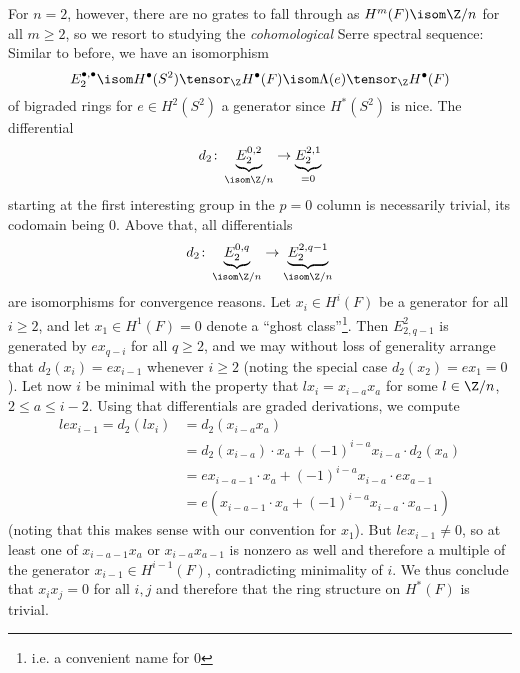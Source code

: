 \begin{solution}
	For $n = 2$, however, there are no grates to fall through as $H^m(F) \isom \Zn{n}$ for all $m \geq 2$, so we resort to studying the \emph{cohomological} Serre spectral sequence:
	Similar to before, we have an isomorphism
	\begin{equation*}
		E_2^{\bullet, \bullet} \isom H^\bullet(S^2) \tensor_{\Z} H^\bullet(F) \isom \Lambda(e) \tensor_{\Z} H^\bullet(F)
	\end{equation*}
	of bigraded rings for $e \in H^2(S^2)$ a generator since $H^*(S^2)$ is nice.
	The differential
	\begin{equation*}
		d_2\colon \underbrace{E_2^{0, 2}}_{\isom \Zn{n}} \to \underbrace{E_2^{2, 1}}_{= 0}
	\end{equation*}
	starting at the first interesting group in the $p = 0$ column is necessarily trivial, its codomain being 0.
	Above that, all differentials
	\begin{equation*}
		d_2\colon \underbrace{E_2^{0, q}}_{\isom \Zn{n}} \to \underbrace{E_2^{2, q - 1}}_{\isom \Zn{n}}
	\end{equation*}
	are isomorphisms for convergence reasons.
	Let $x_i \in H^i(F)$ be a generator for all $i \geq 2$, and let $x_1 \in H^1(F) = 0$ denote a \enquote{ghost class}\footnote{i.e. a convenient name for 0}.
	Then $E^2_{2, q - 1}$ is generated by $e x_{q - i}$ for all $q \geq 2$, and we may without loss of generality arrange that $d_2(x_i) = e x_{i - 1}$ whenever $i \geq 2$ (noting the special case $d_2(x_2) = e x_1 = 0$).
	Let now $i$ be minimal with the property that $l x_i = x_{i - a} x_a$ for some $l \in \Zn{n}$, $2 \leq a \leq i - 2$.
	Using that differentials are graded derivations, we compute
	\begin{align*}
		l e x_{i - 1} = d_2(l x_i) &= d_2(x_{i - a} x_a) \\
								   &= d_2(x_{i - a}) \cdot x_a + (-1)^{i - a} x_{i - a} \cdot d_2(x_a) \\
								   &= e x_{i - a - 1} \cdot x_a + (-1)^{i - a} x_{i - a} \cdot e x_{a - 1} \\
								   &= e (x_{i - a - 1} \cdot x_a + (-1)^{i - a} x_{i - a} \cdot x_{a - 1})
	\end{align*}
	(noting that this makes sense with our convention for $x_1$).
	But $l e x_{i - 1} \neq 0$, so at least one of $x_{i - a - 1} x_a$ or $x_{i - a} x_{a - 1}$ is nonzero as well and therefore a multiple of the generator $x_{i - 1} \in H^{i - 1}(F)$, contradicting minimality of $i$.
	We thus conclude that $x_i x_j = 0$ for all $i, j$ and therefore that the ring structure on $H^*(F)$ is trivial.
\end{solution}

